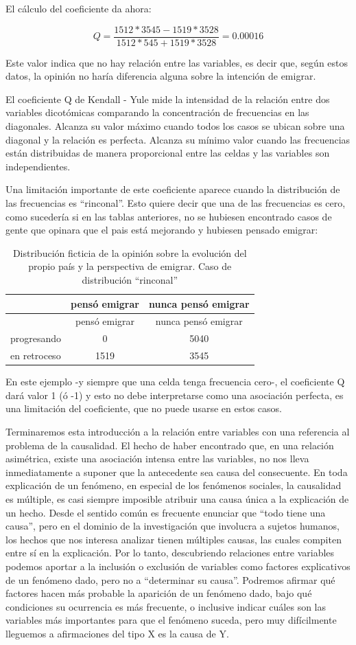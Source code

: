 \documentclass[]{book}
\begin{document}
El cálculo del coeficiente da ahora:

\[Q = \frac{1512*3545-1519*3528}{1512*545+1519*3528} = 0.00016\]

Este valor indica que no hay relación entre las variables, es decir que, según estos datos, la opinión no haría diferencia alguna sobre la intención de emigrar.

El coeficiente Q de Kendall - Yule mide la intensidad de la relación
entre dos variables dicotómicas comparando la concentración de
frecuencias en las diagonales. Alcanza su valor máximo cuando todos los casos se ubican sobre una diagonal y la relación es perfecta. Alcanza su mínimo valor cuando las frecuencias están distribuidas de manera proporcional entre las celdas y las variables son independientes.

Una limitación importante de este coeficiente aparece cuando la
distribución de las frecuencias es ``rinconal''. Esto quiere decir que una de las frecuencias es cero, como sucedería si en las tablas anteriores, no se hubiesen encontrado casos de gente que opinara que el pais está mejorando y hubiesen pensado emigrar:

\begin{longtable}[]{@{}lcc@{}}
\caption{\label{tab:unnamed-chunk-120}Distribución ficticia de la opinión sobre la evolución del propio país y la perspectiva de emigrar. Caso de distribución ``rinconal''}\tabularnewline
\toprule
& pensó emigrar & nunca pensó emigrar\tabularnewline
\midrule
\endfirsthead
\toprule
& pensó emigrar & nunca pensó emigrar\tabularnewline
\midrule
\endhead
progresando & 0 & 5040\tabularnewline
en retroceso & 1519 & 3545\tabularnewline
\bottomrule
\end{longtable}

En este ejemplo -y siempre que una celda tenga frecuencia cero-, el
coeficiente Q dará valor 1 (ó -1) y esto no debe interpretarse como una asociación perfecta, es una limitación del coeficiente, que no puede usarse en estos casos.

Terminaremos esta introducción a la relación entre variables con una referencia al problema de la causalidad. El hecho de haber encontrado
que, en una relación asimétrica, existe una asociación intensa entre las variables, no nos lleva inmediatamente a suponer que la antecedente sea causa del consecuente. En toda explicación de un fenómeno, en especial de los fenómenos sociales, la causalidad es múltiple, es casi siempre imposible atribuir una causa única a la explicación de un hecho. Desde el sentido común es frecuente enunciar que ``todo tiene una causa'', pero en el dominio de la investigación que involucra a sujetos humanos, los hechos que nos interesa analizar tienen múltiples causas, las cuales compiten entre sí en la explicación. Por lo tanto, descubriendo relaciones entre variables podemos aportar a la inclusión o exclusión de variables como factores explicativos de un fenómeno dado, pero no a ``determinar su causa''. Podremos afirmar qué factores hacen más probable la aparición de un fenómeno dado, bajo qué condiciones su ocurrencia es más frecuente, o inclusive indicar cuáles son las variables más importantes para que el fenómeno suceda, pero muy difícilmente lleguemos a afirmaciones del tipo X es la causa de Y.
\end{document}
